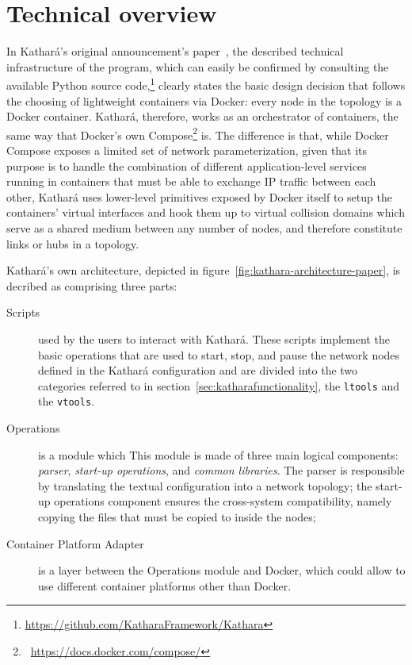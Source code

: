 \section{Technical overview}
\label{sec:katharatechnicaloverview}

In Kathará's original announcement's paper~\cite{kathara}, the described technical infrastructure of the program, which can easily be confirmed by consulting the available Python source code,\footnote{\mbox{\url{https://github.com/KatharaFramework/Kathara}}} clearly states the basic design decision that follows the choosing of lightweight containers via Docker: every node in the topology is a Docker container.
Kathará, therefore, works as an orchestrator of containers, the same way that Docker's own Compose\footnote{~\mbox{\url{https://docs.docker.com/compose/}}} is.
The difference is that, while Docker Compose exposes a limited set of network parameterization, given that its purpose is to handle the combination of different application-level services running in containers that must be able to exchange IP traffic between each other, Kathará uses lower-level primitives exposed by Docker itself to setup the containers' virtual interfaces and hook them up to virtual collision domains which serve as a shared medium between any number of nodes, and therefore constitute links or hubs in a topology.



Kathará's own architecture, depicted in figure~\ref{fig:kathara-architecture-paper}, is decribed as comprising three parts:
\begin{description}
  \item[Scripts] used by the users to interact with Kathará.
  These scripts implement the basic operations that are used to start, stop, and pause the network nodes defined in the Kathará configuration and are divided into the two categories referred to in section~\ref{sec:katharafunctionality}, the \texttt{ltools} and the \texttt{vtools}.
  \item[Operations] is a module which 
  This module is made of three main logical components: \emph{parser}, \emph{start-up operations}, and \emph{common libraries}.
  The parser is responsible by translating the textual configuration into a network topology; the start-up operations component ensures the cross-system compatibility, namely copying the files that must be copied to inside the nodes;
  \item[Container Platform Adapter] is a layer between the Operations module and Docker, which could allow to use different container platforms other than Docker.
\end{description}

